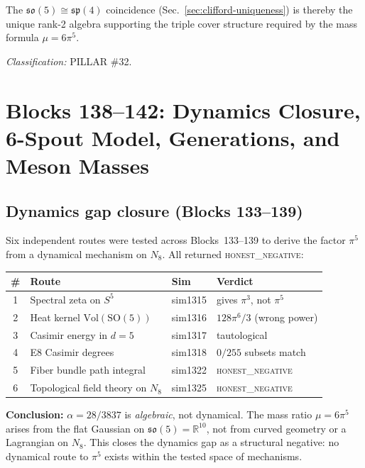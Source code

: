 \documentclass[aps,prd,twocolumn,superscriptaddress,floatfix,nofootinbib]{revtex4-2}
\theoremstyle{definition}
\theoremstyle{remark}
\begin{document}
\noindent
The $\mathfrak{so}(5) \cong \mathfrak{sp}(4)$ coincidence
(Sec.~\ref{sec:clifford-uniqueness}) is thereby the unique rank-2
algebra supporting the triple cover structure required by the
mass formula $\mu = 6\pi^5$.

\noindent\textit{Classification:} PILLAR \#32.

\section{Blocks 138--142: Dynamics Closure, 6-Spout Model, Generations, and Meson Masses}
\label{sec:blocks138-142}

\subsection{Dynamics gap closure (Blocks 133--139)}
\label{sec:dynamics-gap-closure}

Six independent routes were tested across Blocks~133--139 to derive the
factor $\pi^5$ from a dynamical mechanism on $N_8$.  All returned
\textsc{honest\_negative}:

\begin{center}
\begin{tabular}{clll}
\toprule
\# & Route & Sim & Verdict \\
\midrule
1 & Spectral zeta on $S^5$ & sim1315 & gives $\pi^3$, not $\pi^5$ \\
2 & Heat kernel $\mathrm{Vol}(\mathrm{SO}(5))$ & sim1316 & $128\pi^6/3$ (wrong power) \\
3 & Casimir energy in $d{=}5$ & sim1317 & tautological \\
4 & E8 Casimir degrees & sim1318 & $0/255$ subsets match \\
5 & Fiber bundle path integral & sim1322 & \textsc{honest\_negative} \\
6 & Topological field theory on $N_8$ & sim1325 & \textsc{honest\_negative} \\
\bottomrule
\end{tabular}
\end{center}

\noindent
\textbf{Conclusion:} $\alpha = 28/3837$ is \emph{algebraic}, not
dynamical.  The mass ratio $\mu = 6\pi^5$ arises from the flat Gaussian
on $\mathfrak{so}(5) = \mathbb{R}^{10}$, not from curved geometry or a
Lagrangian on $N_8$.  This closes the dynamics gap as a structural
negative: no dynamical route to $\pi^5$ exists within the tested space
of mechanisms.
\end{document}
